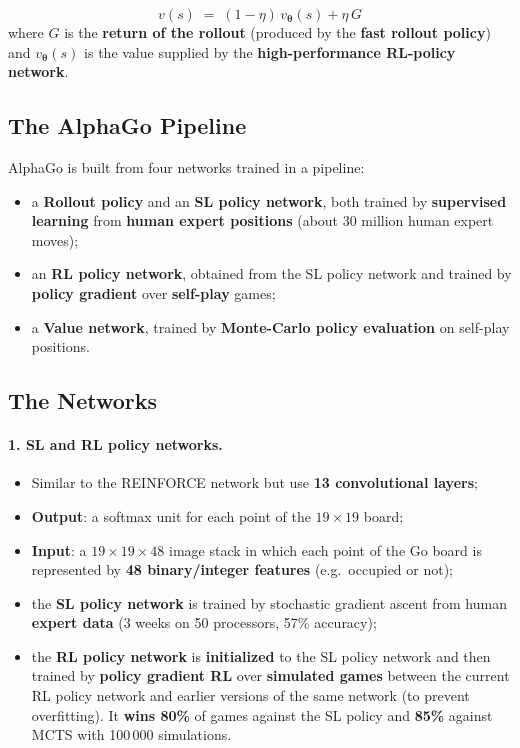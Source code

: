 \documentclass[11pt,a4paper]{article}
\theoremstyle{definition}
\theoremstyle{plain}
\theoremstyle{remark}
\begin{document}
\begin{tcolorbox}[colback=blue!5!white, colframe=blue!60!black, title={State-Node Value in APV-MCTS}]
\[
    v(s) \;=\; (1 - \eta)\, v_{\boldsymbol{\theta}}(s) + \eta\, G
\]
where $G$ is the \textbf{return of the rollout} (produced by the \textbf{fast rollout policy}) and $v_{\boldsymbol{\theta}}(s)$ is the value supplied by the \textbf{high-performance RL-policy network}.
\end{tcolorbox}

\subsection{The AlphaGo Pipeline}

AlphaGo is built from four networks trained in a pipeline:
\begin{itemize}
    \item a \textbf{Rollout policy} and an \textbf{SL policy network}, both trained by \textbf{supervised learning} from \textbf{human expert positions} (about 30 million human expert moves);
    \item an \textbf{RL policy network}, obtained from the SL policy network and trained by \textbf{policy gradient} over \textbf{self-play} games;
    \item a \textbf{Value network}, trained by \textbf{Monte-Carlo policy evaluation} on self-play positions.
\end{itemize}

\subsection{The Networks}

\paragraph{1. SL and RL policy networks.}
\begin{itemize}
    \item Similar to the REINFORCE network but use \textbf{13 convolutional layers};
    \item \textbf{Output}: a softmax unit for each point of the $19 \times 19$ board;
    \item \textbf{Input}: a $19 \times 19 \times 48$ image stack in which each point of the Go board is represented by \textbf{48 binary/integer features} (e.g.\ occupied or not);
    \item the \textbf{SL policy network} is trained by stochastic gradient ascent from human \textbf{expert data} (3 weeks on 50 processors, 57\% accuracy);
    \item the \textbf{RL policy network} is \textbf{initialized} to the SL policy network and then trained by \textbf{policy gradient RL} over \textbf{simulated games} between the current RL policy network and earlier versions of the same network (to prevent overfitting). It \textbf{wins 80\%} of games against the SL policy and \textbf{85\%} against MCTS with 100\,000 simulations.
\end{itemize}
\end{document}
